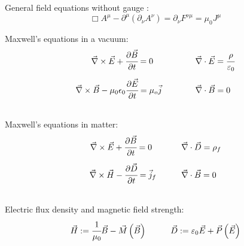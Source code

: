 		\noindent
		General field equations without gauge :
		\begin{equation}
			\Box A^\mu-\partial^\mu\left(\partial_\nu A^\nu\right) = \partial_\nu F^{\nu\mu} =  \mu_0 J^\mu
		\end{equation}

		\noindent
		Maxwell's equations in a vacuum:
		\begin{equation}
		\begin{array}{rl}
			\vec{\nabla}\times \vec{E} + \cfrac{\partial\vec{B}}{\partial t} = 0 \phantom{\mu_0}
			&\hspace{30pt} \vec{\nabla}\cdot\vec{E} = \cfrac{\rho}{\varepsilon_0} \\ \xrowht{40pt}
			\vec{\nabla}\times\vec{B} - \mu_0 \epsilon_0 \cfrac{\partial \vec{E}}{\partial t} = \mu_o\vec{j}
			&\hspace{30pt} \vec{\nabla}\cdot\vec{B} = 0 \\
		\end{array}
		\end{equation}

		\noindent
		Maxwell's equations in matter:
		\begin{equation}
		\begin{array}{rl}
			\vec{\nabla}\times \vec{E} + \cfrac{\partial\vec{B}}{\partial t} = 0 \phantom{_f}
			&\hspace{20pt} \vec{\nabla}\cdot\vec{D} = \rho_f\\ \xrowht{40pt}
			\vec{\nabla}\times\vec{H} - \cfrac{\partial \vec{D}}{\partial t} = \vec{j}_f
			&\hspace{20pt} \vec{\nabla}\cdot\vec{B} = 0 \\
		\end{array}
		\end{equation}

		\noindent
		Electric flux density and magnetic field strength:%
		\begin{equation} \label{Eq:FluxDensityFieldStrength}
		\begin{array}{cc}
			\vec{H} := \cfrac{1}{\mu_0}\Vec{B} - \vec{M}\left(\vec{B}\right)
			&\hspace{20pt} \vec{D} := \varepsilon_0\vec{E} + \vec{P}\left(\vec{E}\right)
		\end{array}
		\end{equation}



